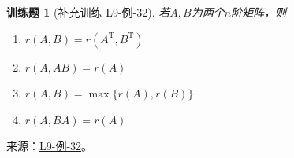 \documentclass[12pt,fontset=fandol]{ctexart}
\newtheorem{exercise}{训练题}[section]
\begin{document}
\begin{exercise}[补充训练 L9-例-32]\label{prob:L9-例-32}
若$A,B$为两个$n$阶矩阵，则
    \begin{enumerate}[label=\Alph*.]
        \item $r(A,B)=r(A^\mathrm{T},B^\mathrm{T})$

        \item $r(A,AB)=r(A)$

        \item $r(A,B)=\max\{r(A), r(B)\}$

        \item $r(A,BA)=r(A)$
    \end{enumerate}
\end{exercise}
\noindent 来源：\href{https://github.com/yhwu-is/Linear-Algebra-Left-Undone/blob/new/%E8%AE%B2%E4%B9%89/%E4%B8%93%E9%A2%98/9%20%E7%9F%A9%E9%98%B5%E8%BF%90%E7%AE%97%E8%BF%9B%E9%98%B6.tex}{L9-例-32}。
\end{document}
